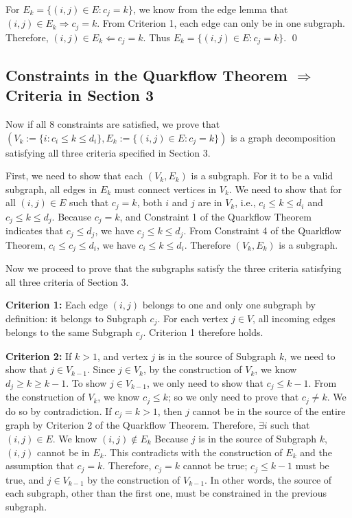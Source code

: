 \documentclass[review]{siamart0216}
\begin{document}
For $E_k=\{(i,j)\in E : c_j=k\}$, we know from the edge lemma that
$(i,j)\in E_k \Rightarrow c_j=k$.  From Criterion 1, each edge can only be
in one subgraph.  Therefore, $(i,j)\in E_k \Leftarrow c_j=k$.
Thus $E_k=\{(i,j)\in E : c_j=k\}$. \qed

\subsection{Constraints in the Quarkflow Theorem $\Longrightarrow$
Criteria in Section 3}

Now if all 8 constraints are satisfied, we prove that 
$(V_k:=\{i : c_i\le k\le d_i\},E_k:=\{(i,j)\in E : c_j=k\})$
is a graph decomposition satisfying all three criteria specified in Section 3.

First, we need to show that each $(V_k,E_k)$ is a subgraph.  For it to be
a valid subgraph, all edges in $E_k$ must connect vertices in $V_k$.
We need to show that
for all $(i,j)\in E$ such that $c_j=k$, both $i$ and $j$ are in $V_k$,
i.e., $c_i\le k\le d_i$ and $c_j\le k\le d_j$.
Because $c_j=k$, and Constraint 1 of the Quarkflow Theorem indicates that
$c_j\le d_j$, we have $c_j\le k\le d_j$.  From Constraint 4 of the Quarkflow
Theorem, $c_i\le c_j\le d_i$, we have $c_i\le k\le d_i$.
Therefore $(V_k,E_k)$ is a subgraph.

Now we proceed to prove that the subgraphs satisfy the three criteria
satisfying all three criteria of Section 3.

{\bf Criterion 1:}
Each edge $(i,j)$ belongs to one and only one subgraph by definition: it
belongs to Subgraph $c_j$.  For each vertex $j\in V$, all incoming edges
belongs to the same Subgraph $c_j$.  Criterion 1 therefore holds.

{\bf Criterion 2:}
If $k>1$, and vertex $j$ is in the source of Subgraph $k$, we need to show that
$j\in V_{k-1}$.  Since $j\in V_k$, by the construction of $V_k$, we know
$d_j\ge k\ge k-1$.  To show $j\in V_{k-1}$, we only need to show that
$c_j \le k-1$.  From the construction of $V_k$, we know $c_j\le k$;
so we only need to prove that $c_j\ne k$.  We do so by contradiction.
If $c_j=k>1$, then $j$ cannot be in the source
of the entire graph by Criterion 2 of the Quarkflow Theorem.  Therefore,
$\exists i$ such that $(i,j)\in E$.  We know $(i,j)\notin E_k$
Because $j$ is in the source of Subgraph $k$, $(i,j)$ cannot be in $E_k$.
This contradicts with the construction of $E_k$ and the assumption that $c_j=k$.
Therefore, $c_j=k$ cannot be true; $c_j \le k-1$ must be true,
and $j\in V_{k-1}$ by the construction of $V_{k-1}$.
In other words, the source of each subgraph, other than the
first one, must be constrained in the previous subgraph.
\end{document}
